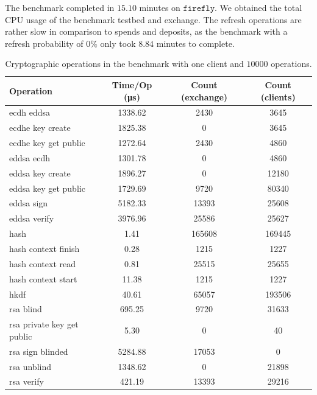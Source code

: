 The benchmark completed in $15.10$ minutes on $\texttt{firefly}$. We obtained the total CPU usage of
the benchmark testbed and exchange.  The refresh operations are rather slow in comparison
to spends and deposits, as the benchmark with a refresh probability of $0\%$ only took $8.84$
minutes to complete.

\begin{table}
  \centering
  \begin{tabular}{lSSS}
  \toprule
  Operation & {Time/Op (\si{\micro\second})} & {Count (exchange)} & {Count (clients)} \\
  \midrule
ecdh eddsa                  & 1338.62   &  2430   & 3645   \\ 
ecdhe key create            & 1825.38   &  0      & 3645   \\ 
ecdhe key get public        & 1272.64   &  2430   & 4860   \\ 
eddsa ecdh                  & 1301.78   &  0      & 4860   \\ 
eddsa key create            & 1896.27   &  0      & 12180  \\ 
eddsa key get public        & 1729.69   &  9720   & 80340  \\ 
eddsa sign                  & 5182.33   &  13393  & 25608  \\ 
eddsa verify                & 3976.96   &  25586  & 25627  \\ 
hash                        & 1.41   &  165608 & 169445 \\ 
hash context finish         & 0.28  &  1215   & 1227   \\ 
hash context read           & 0.81  &  25515  & 25655  \\ 
hash context start          & 11.38   &  1215   & 1227   \\ 
hkdf                        & 40.61   &  65057  & 193506 \\ 
rsa blind                   & 695.25   &  9720   & 31633  \\ 
rsa private key get public  & 5.30       &  0      & 40     \\ 
rsa sign blinded            & 5284.88   &  17053  & 0      \\ 
rsa unblind                 & 1348.62   &  0      & 21898  \\ 
rsa verify                  & 421.19   &  13393  & 29216  \\ 
  \bottomrule
  \end{tabular}
  \caption{Cryptographic operations in the benchmark with one client and $10000$ operations.}
  \label{table:benchmark:ops-baseline}
\end{table}


